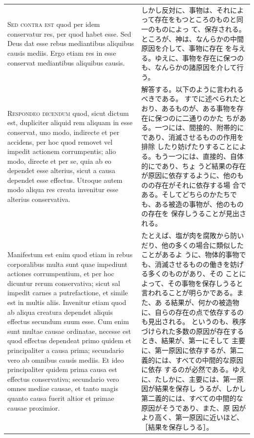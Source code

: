 \documentclass[paper=a4paper,fontsize=10pt,jafontsize=9pt,titlepage]{jlreq}
\begin{document}
\begin{longtable}{p{21em}p{21em}}
{\scshape  Sed contra est} quod per idem conservatur
res, per quod habet esse. Sed Deus dat esse rebus mediantibus aliquibus
causis mediis. Ergo etiam res in esse conservat mediantibus aliquibus
causis.

&

しかし反対に、事物は、それによって存在をもつところのものと同一のものによっ
 て、保存される。ところが、神は、なんらかの中間原因を介して、事物に存在
 を与える。ゆえに、事物を存在に保つのも、なんらかの諸原因を介して行う。

\\


{\scshape Respondeo dicendum} quod, sicut dictum est,
dupliciter aliquid rem aliquam in esse conservat, uno modo, indirecte et
per accidens, per hoc quod removet vel impedit actionem corrumpentis;
alio modo, directe et per se, quia ab eo dependet esse alterius, sicut a
causa dependet esse effectus. Utroque autem modo aliqua res creata
invenitur esse alterius conservativa. 



&

解答する。以下のように言われるべきである。
すでに述べられたとおり、あるものが、ある事物を存在に保つのに二通りのかた
 ちがある。一つには、間接的、附帯的にであり、消滅させるものの作用を排除
 したり妨げたりすることによる。もう一つには、直接的、自体的にであり、ちょ
 うど結果の存在が原因に依存するように、他のものの存在がそれに依存する場
 合である。そしてどちらのかたちでも、ある被造の事物が、他のものの存在を
 保存しうることが見出される。

\\


Manifestum est enim quod etiam in
rebus corporalibus multa sunt quae impediunt actiones corrumpentium, et
per hoc dicuntur rerum conservativa; sicut sal impedit carnes a
putrefactione, et simile est in multis aliis. Invenitur etiam quod ab
aliqua creatura dependet aliquis effectus secundum suum esse. 
Cum enim
sunt multae causae ordinatae, necesse est quod effectus dependeat primo
quidem et principaliter a causa prima; secundario vero ab omnibus causis
mediis. Et ideo principaliter quidem prima causa est effectus
conservativa; secundario vero omnes mediae causae, et tanto magis quanto
causa fuerit altior et primae causae proximior. 

&
たとえば、塩が肉を腐敗から防いだり、他の多くの場合に類似したことがあるよ
 うに、物体的事物でも、消滅させるものの働きを妨げる多くのものがあり、その
 ことによって、その事物を保存しうると言われることが明らかである。また、あ
 る結果が、何かの被造物に、自らの存在の点で依存するのも見出される。
というのも、秩序づけられた多数の原因が存在するとき、結果が、第一にそして
 主要に、第一原因に依存するが、第二義的には、すべての中間的な原因に依存
 するのが必然である。ゆえに、たしかに、主要には、第一原因が結果を保存し
 うるが、しかし第二義的には、すべての中間的な原因がそうであり、また、原
 因がより高く、第一原因に近いほど、［結果を保存しうる］。


\end{longtable}
\end{document}
